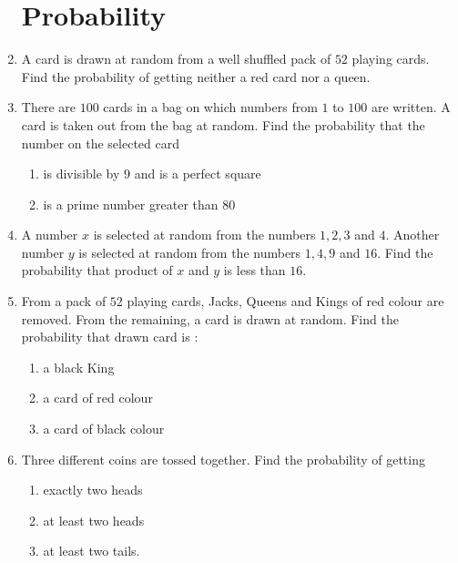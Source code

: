 \documentclass[12pt,-letter paper]{article}
\theoremstyle{remark}
\begin{document}
\begin{enumerate}
\section{Probability}
\item A card is drawn at random from a well shuffled pack of $52$ playing cards. Find the probability of getting neither a red card nor a queen.\\
\item There are $100$ cards in a bag on which numbers from $1$ to $100$ are written. A card is taken out from the bag at random. Find the probability that the number on the selected card 
\begin{enumerate}[label=(\roman*)]
\item is divisible by $9$ and is a perfect square 
\item is a prime number greater than $80$
\end{enumerate}
\item A number $x$ is selected at random from the numbers $1, 2, 3$ and $4$. Another number $y$ is selected at random from the numbers $1, 4, 9$ and $16$. Find the probability that product of $x$ and $y$ is less than $16$.\\
\item From a pack of $52$ playing cards, Jacks, Queens and Kings of red colour are removed. From the remaining, a card is drawn at random. Find the probability that drawn card is :
\begin{enumerate}[label=(\roman*)]
\item a black King 
\item a card of red colour 
\item a card of black colour
\end{enumerate}
\item  Three different coins are tossed together. Find the probability of getting 
\begin{enumerate}[label=(\roman*)]
\item exactly two heads 
\item at least two heads 
\item at least two tails.
\end{enumerate}


\end{enumerate}
\end{document}
